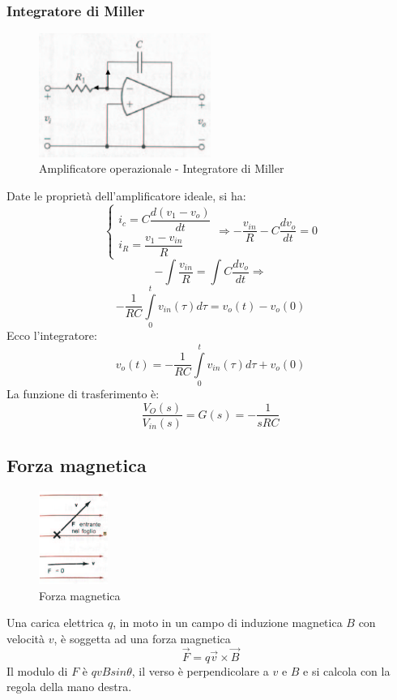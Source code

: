 \documentclass[a4paper]{report}
\begin{document}
\subsubsection{Integratore di Miller}
\begin{figure}[!h]
\centering
\includegraphics[width=0.5\textwidth]{./images/opamp03.png}
\caption{Amplificatore operazionale - Integratore di Miller\label{fig:opamp-mil}}
\end{figure}
Date le propriet\`a dell'amplificatore ideale, si ha:
\[
  \left\{\begin{array}{l}
    i_c = C \dfrac{d(v_1 - v_o)}{dt}\\
    i_R = \dfrac{v_1 - v_{in}}{R}
  \end{array}\right .
  \Rightarrow - \dfrac{v_{in}}{R} - C \dfrac{dv_o}{dt} = 0
\]
\[
  - \int\dfrac{v_{in}}{R} = \int C \dfrac{dv_o}{dt} \Rightarrow
\]
\[
  - \dfrac{1}{RC}\int\limits_0^t v_{in}(\tau)d\tau = v_o(t) - v_o(0)
\]
Ecco l'integratore:
\[
  v_o(t) = - \dfrac{1}{RC}\int\limits_0^t v_{in}(\tau)d\tau + v_o(0)
\]
La funzione di trasferimento \`e:
\[
  \dfrac{V_O (s)}{V_{in} (s)} = G (s) = - \dfrac{1}{sRC}
\]

\subsection{Forza magnetica}
\begin{figure}[!h]
\centering
\includegraphics[width=0.2\textwidth]{./images/forza-magnetica.png}
\caption{Forza magnetica\label{fig:forza-magnetica}}
\end{figure}
Una carica elettrica $q$, in moto in un campo di induzione magnetica $B$ con
velocit\`a $v$, \`e soggetta ad una forza magnetica
\begin{equation}\label{eq:forza-magnetica}
  \vec{F} = q \vec{v} \times \vec{B}
\end{equation}
Il modulo di $F$ \`e $q v B sin \theta$, il verso \`e perpendicolare a
$v$ e $B$ e si calcola con la regola della mano destra.
\end{document}
